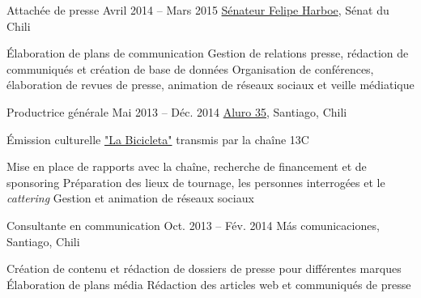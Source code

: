 \begin{joblist}
{{\begin{itemize}
		\end{itemize}      
        }
	}



\item[Attachée de presse]{Avril 2014 -- Mars 2015}
     {
     \href{https://www.harboe.cl/}{Sénateur Felipe Harboe}, Sénat du Chili
     } 
	 {
        \normalsize{
		\iftbftiny \vspace{-0.5cm} \fi
			\begin{itemize}
			  \iftbftiny \setlength\itemsep{-3pt} \fi
			  \cvitem[\checkmark] Élaboration de plans de communication
			  \cvitem[\checkmark] Gestion de relations presse, rédaction de communiqués et création de base de données
			  \cvitem[\checkmark] Organisation de conférences, élaboration de revues de presse, animation de réseaux sociaux et veille médiatique
			\end{itemize}     
		}	
	}
    
    
    
\item[Productrice générale]{Mai 2013 -- Déc. 2014}
     {
     \href{https://www.aluro35.com/}{Aluro 35}, Santiago, Chili
     }
     {Émission culturelle \href{http://www.13.cl/c/programas/la-bicicleta}{"La Bicicleta"} transmis par la chaîne 13C \\

        \normalsize{
		\iftbftiny \vspace{-0.5cm} \fi
			\begin{itemize}
			  \iftbftiny \setlength\itemsep{-3pt} \fi
			  \cvitem[\checkmark] Mise en place de rapports avec la chaîne, recherche de financement et de sponsoring                     
			  \cvitem[\checkmark] Préparation des lieux de tournage, les personnes interrogées et le \textit{cattering}
			  \cvitem[\checkmark] Gestion et animation de réseaux sociaux
			\end{itemize}     
		}	
	}



\item[Consultante en communication]{Oct. 2013 -- Fév. 2014 }     
  	{
  	Más comunicaciones, Santiago, Chili
  	}     
  	{
        \normalsize{
		\iftbftiny \vspace{-0.5cm} \fi
		\begin{itemize}
			  \iftbftiny \setlength\itemsep{-3pt} \fi
			  \cvitem[\checkmark]  Création de contenu et rédaction de dossiers de presse pour différentes marques                                
			  \cvitem[\checkmark]  Élaboration de plans média                                    
			  \cvitem[\checkmark]  Rédaction des articles web et communiqués de presse
			  

\end{itemize}}}
\end{joblist}
